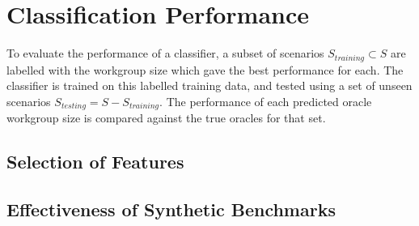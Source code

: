 

\section{Classification Performance}


To evaluate the performance of a classifier, a subset of scenarios
$S_{training} \subset S$ are labelled with the workgroup size which
gave the best performance for each. The classifier is trained on this
labelled training data, and tested using a set of unseen scenarios
$S_{testing} = S - S_{training}$. The performance of each predicted
oracle workgroup size is compared against the true oracles for that
set. %








\subsection{Selection of Features}



\subsection{Effectiveness of Synthetic Benchmarks}

